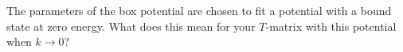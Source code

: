 \documentclass[graybox,sectrefs,envcountresetchap,open=right]{svmonodo}
\newenvironment{doconceexercise}{}{}
\begin{document}
\begin{doconceexercise}
\begin{comment}
      END SUBROUTINE lubksb
\end{lstlisting}
\end{comment}
The parameters of the box potential are chosen to fit a
potential with a bound state at zero energy. What does this mean
for your $T$-matrix with this potential when
$k\rightarrow 0$?






\end{doconceexercise}
\end{document}
